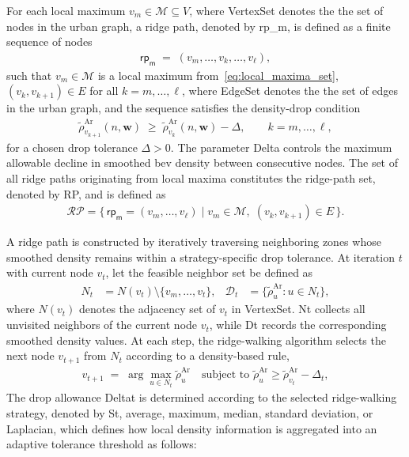 For each local maximum $v_m \in \mathcal{M} \subseteq V$, where \gls{VertexSet} denotes the the set of nodes in the urban graph, a ridge path, denoted by \gls{rp_m}, is defined as a finite sequence of nodes 
\begin{align}
  \label{eq:ridge_path}
  \mathsf{rp_m} \;=\; (v_m, \dots, v_k, \dots, v_\ell),
\end{align}
such that $v_m \in \mathcal{M}$ is a local maximum from~\eqref{eq:local_maxima_set},
$(v_{k}, v_{k+1}) \in E$ for all $k = m, \dots, \ell$, where \gls{EdgeSet} denotes the the set of edges in the urban graph, and the sequence satisfies the density-drop condition
\begin{align}
   \tilde{\rho}^{\mathrm{Ar}}_{v_{k+1}}(n,\mathbf{w}) 
   \;\ge\; \tilde{\rho}^{\mathrm{Ar}}_{v_{k}}(n,\mathbf{w}) - \Delta,
   \qquad k = m, \dots, \ell,
\end{align}
for a chosen drop tolerance $\Delta > 0$. The parameter \gls{Delta} controls the maximum allowable decline in smoothed \gls{bev} density between consecutive nodes. The set of all ridge paths originating from local maxima constitutes the ridge-path set, denoted by \gls{RP}, and is defined as
\begin{align}
  \label{eq:ridge_path_set}
  \mathcal{RP}
   = \bigl\{\,
      \mathsf{rp_m} = (v_m, \dots, v_\ell)
      \;\big|\;
      v_m \in \mathcal{M},\;
      (v_k, v_{k+1}) \in E
   \,\bigr\}.
\end{align}

A ridge path is constructed by iteratively traversing neighboring zones whose smoothed density remains within a strategy-specific drop tolerance. At iteration $t$ with current node $v_t$, let the feasible neighbor set be defined as
\begin{align}
N_t &= N(v_t)\setminus \{v_m,\dots,v_t\}, 
&
\mathcal{D}_t &= \{\tilde{\rho}^{\mathrm{Ar}}_u : u \in N_t\},
\end{align}
where $N(v_t)$ denotes the adjacency set of $v_t$ in \gls{VertexSet}.
\gls{Nt} collects all unvisited neighbors of the current node $v_t$, 
while \gls{Dt} records the corresponding smoothed density values. 
At each step, the ridge-walking algorithm selects the next node $v_{t+1}$ from 
$N_t$ according to a density-based rule,
\begin{align}
v_{t+1} \;=\; \arg\max_{u \in N_t} \tilde{\rho}^{\mathrm{Ar}}_u
\quad \text{subject to } 
\tilde{\rho}^{\mathrm{Ar}}_u \ge \tilde{\rho}^{\mathrm{Ar}}_{v_t} - \Delta_t,
\end{align}
The drop allowance \gls{Deltat} is determined according to the selected ridge-walking strategy, denoted by \gls{St}, average, maximum, median, standard deviation, or Laplacian, which defines how local density information is aggregated into an adaptive tolerance threshold  as follows:


